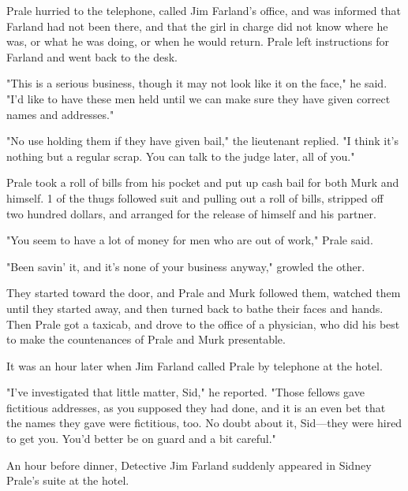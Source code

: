 \documentclass{novel}
\begin{document}
Prale hurried to the telephone, called Jim Farland's office, and was informed that Farland had not been there, and that the girl in charge did not know where he was, or what he was doing, or when he would return. Prale left instructions for Farland and went back to the desk.

"This is a serious business, though it may not look like it on the face," he said. "I'd like to have these men held until we can make sure they have given correct names and addresses."

"No use holding them if they have given bail," the lieutenant replied. "I think it's nothing but a regular scrap. You can talk to the judge later, all of you."

Prale took a roll of bills from his pocket and put up cash bail for both Murk and himself. 1 of the thugs followed suit and pulling out a roll of bills, stripped off two hundred dollars, and arranged for the release of himself and his partner.

"You seem to have a lot of money for men who are out of work," Prale said.

"Been savin' it, and it's none of your business anyway," growled the other.

They started toward the door, and Prale and Murk followed them, watched them until they started away, and then turned back to bathe their faces and hands. Then Prale got a taxicab, and drove to the office of a physician, who did his best to make the countenances of Prale and Murk presentable.

It was an hour later when Jim Farland called Prale by telephone at the hotel.

"I've investigated that little matter, Sid," he reported. "Those fellows gave fictitious addresses, as you supposed they had done, and it is an even bet that the names they gave were fictitious, too. No doubt about it, Sid---they were hired to get you. You'd better be on guard and a bit careful."

\vspace{2\nbs}
\clearpage
\thispagestyle{empty}

\begin{ChapterStart}
\vspace{3\nbs}
\end{ChapterStart}
    
An hour before dinner, Detective Jim Farland suddenly appeared in Sidney Prale's suite at the hotel.
\end{document}
